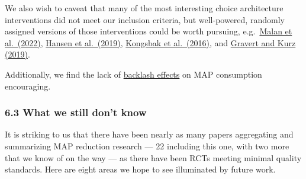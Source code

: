 \documentclass[
  letterpaper,
  DIV=11,
  numbers=noendperiod]{scrartcl}
\begin{document}
We also wish to caveat that many of the most interesting choice
architecture interventions did not meet our inclusion criteria, but
well-powered, randomly assigned versions of those interventions could be
worth pursuing,
e.g.~\href{https://www.journals.uchicago.edu/doi/10.1086/720450}{Malan
et al.~(2022)},
\href{https://academic.oup.com/jpubhealth/article/43/2/392/5637580}{Hansen
et al.~(2019)},
\href{https://www.sciencedirect.com/science/article/abs/pii/S0950329315300227?via\%3Dihub}{Kongsbak
et al.~(2016)}, and \href{https://doi.org/10.1017/bpp.2019.11}{Gravert
and Kurz (2019)}.

Additionally, we find the lack of
\href{https://faunalytics.org/relative-effectiveness/}{backlash effects}
on MAP consumption encouraging.

\hypertarget{what-we-still-dont-know}{%
\subsubsection{6.3 What we still don't
know}\label{what-we-still-dont-know}}

It is striking to us that there have been nearly as many papers
aggregating and summarizing MAP reduction research --- 22 including this
one, with two more that we know of on the way --- as there have been
RCTs meeting minimal quality standards. Here are eight areas we hope to
see illuminated by future work.
\end{document}
